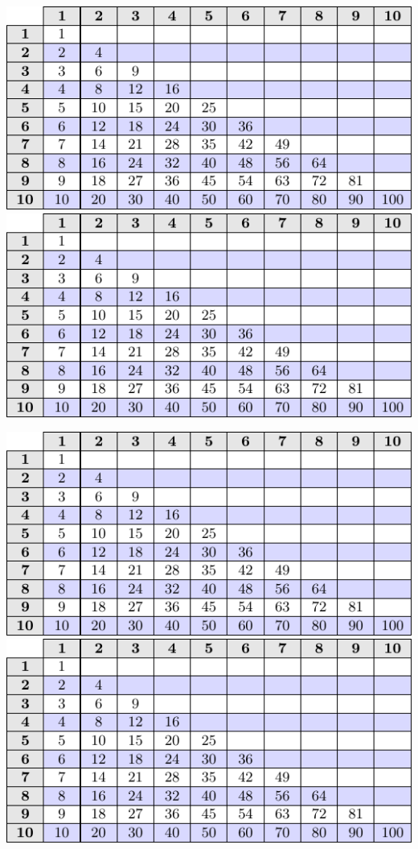 \vspace{10pt}
\begin{center}
	\includegraphics{gangetabell} \qquad
	\includegraphics{gangetabell}  
\end{center}
\vspace{10pt}
\begin{center}
	\includegraphics{gangetabell} \qquad
	\includegraphics{gangetabell}  
\end{center}
